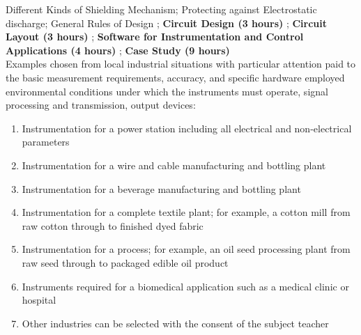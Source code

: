 {{        Different Kinds of Shielding Mechanism;
        Protecting against Electrostatic discharge;
        General Rules of Design
    };
    \textbf{Circuit Design \hfill (3 hours)}
    ;
    \textbf{Circuit Layout \hfill (3 hours)}
    ;
    \textbf{Software for Instrumentation and Control Applications \hfill (4 hours)}
    ;
    \textbf{Case Study \hfill (9 hours)}
    \\
    Examples chosen from local industrial situations with particular attention paid to the basic measurement requirements, accuracy, and specific hardware employed environmental conditions under which the instruments must operate, signal processing and transmission, output devices:
    \begin{enumerate}[label=\alph*)]
        \item Instrumentation for a power station including all electrical and non-electrical parameters
        \item Instrumentation for a wire and cable manufacturing and bottling plant
        \item Instrumentation for a beverage manufacturing and bottling plant
        \item Instrumentation for a complete textile plant{;} for example, a cotton mill from raw cotton through to finished dyed fabric
        \item Instrumentation for a process{;} for example, an oil seed processing plant from raw seed through to packaged edible oil product
        \item Instruments required for a biomedical application such as a medical clinic or hospital
        \item Other industries can be selected with the consent of the subject teacher
    \end{enumerate}
}

